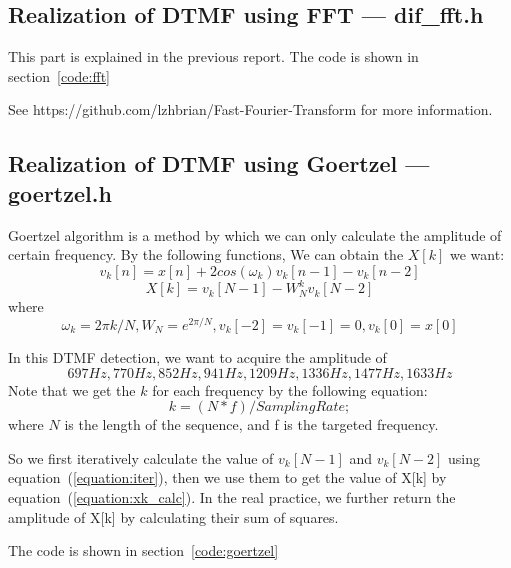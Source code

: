 
\subsection{Realization of DTMF using FFT --- dif\_fft.h}
This part is explained in the previous report. 
The code is shown in section~\ref{code:fft}

See https://github.com/lzhbrian/Fast-Fourier-Transform for more information. 

\subsection{Realization of DTMF using Goertzel --- goertzel.h}
Goertzel algorithm is a method by which we can only calculate the amplitude of certain frequency.
By the following functions, We can obtain the $X[k]$ we want:
\begin{equation}\label{equation:iter}
v_{k}[n] = x[n] + 2cos(\omega_{k})v_{k}[n-1]-v_{k}[n-2]
\end{equation}
\begin{equation}\label{equation:xk_calc}
X[k] = v_{k}[N-1] - W^{k}_{N}v_{k}[N-2]
\end{equation}
where 
$$\omega_{k} = 2\pi k/N, W_{N}=e^{2\pi /N}, v_{k}[-2]=v_{k}[-1]=0, v_{k}[0]=x[0]$$

In this DTMF detection, we want to acquire the amplitude of 
$$697Hz, 770Hz, 852Hz, 941Hz, 1209Hz, 1336Hz, 1477Hz, 1633Hz$$
Note that we get the $k$ for each frequency by the following equation:
\begin{equation}
k = ( N * f ) / SamplingRate;
\end{equation}
where $N$ is the length of the sequence, and f is the targeted frequency.

So we first iteratively calculate the value of $v_{k}[N-1]$ and $v_{k}[N-2]$ using equation~(\ref{equation:iter}), then we use them to get the value of X[k] by equation~(\ref{equation:xk_calc}).
In the real practice, we further return the amplitude of X[k] by calculating their sum of squares.

The code is shown in section~\ref{code:goertzel}
